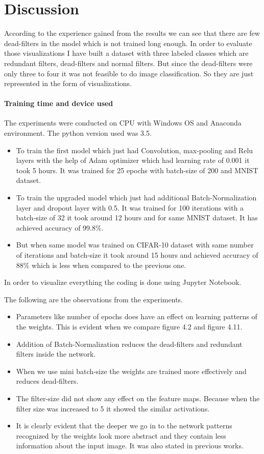 \chapter{Discussion}\label{chap:discussion}

According to the experience gained from the results we can see that there are few dead-filters in the model which is not trained long enough. In order to evaluate those visualizations I have built a dataset with three labeled classes which are redundant filters, dead-filters and normal filters. But since the dead-filters were only three to four it was not feasible to do image classification. So they are just represented in the form of visualizations. 
\subsubsection{Training time and device used}

The experiments were conducted on CPU with Windows OS and Anaconda environment. The python version used was 3.5.
\begin{itemize}
    \item To train the first model which just had Convolution, max-pooling and Relu layers with the help of Adam optimizer which had learning rate of 0.001 it took 5 hours. It was trained for 25 epochs with batch-size of 200 and MNIST dataset.
    \item To train the upgraded model which just had additional Batch-Normalization layer and dropout layer with 0.5. It was trained for 100 iterations with a batch-size of 32 it took around 12 hours and for same MNIST dataset. It has achieved accuracy of 99.8\%.
    \item But when same model was trained on CIFAR-10 dataset with same number of iterations and batch-size it took around 15 hours and achieved accuracy of 88\% which is less when compared to the previous one.
\end{itemize}

\noindent In order to visualize everything the coding is done using Jupyter Notebook.

\newpage \noindent The following are the observations from the experiments.
\begin{itemize}
    \item Parameters like number of epochs does have an effect on learning patterns of the weights. This is evident when we compare figure 4.2 and figure 4.11.
    \item Addition of Batch-Normalization reduces the dead-filters and redundant filters inside the network.
    \item When we use mini batch-size the weights are trained more effectively and reduces dead-filters. 
    \item The filter-size did not show any effect on the feature maps. Because when the filter size was increased to 5 it showed the similar activations. 
    \item It is clearly evident that the deeper we go in to the network patterns recognized by the weights look more abstract and they contain less information about the input image. It was also stated in previous works.
\end{itemize}



